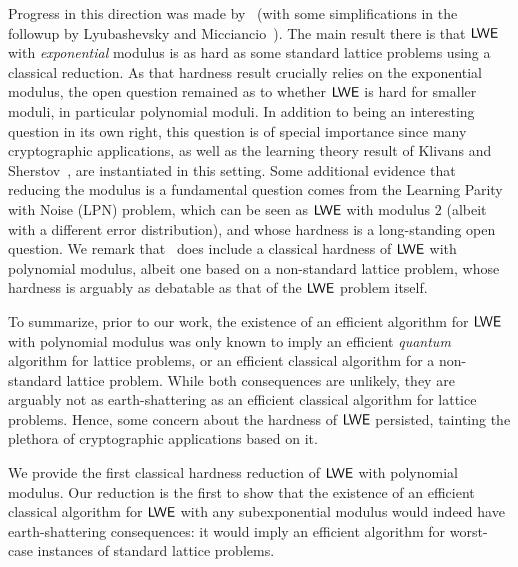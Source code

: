 Progress in this direction was made
by~\cite{DBLP:conf/stoc/Peikert09} (with some simplifications in the
followup by Lyubashevsky and
Micciancio~\cite{DBLP:conf/crypto/LyubashevskyM09}).  The main result
there is that $\mathsf{LWE}$ with \emph{exponential} modulus is as hard as
some standard lattice problems using a
classical reduction.  
As that hardness result crucially relies on the
exponential modulus, the open question remained as to whether $\mathsf{LWE}$
is hard for smaller moduli, in particular polynomial moduli. In
addition to being an interesting question in its own right, this question is of special importance since many cryptographic applications, as well as the learning theory
result of Klivans and Sherstov~\cite{DBLP:conf/focs/KlivansS06}, are instantiated in this setting.
Some additional evidence that reducing the
modulus is a fundamental question comes from the Learning Parity with
Noise (LPN) problem, which can be seen as $\mathsf{LWE}$ with modulus $2$
(albeit with a different error distribution), and whose hardness is a
long-standing open question.  We remark
that~\cite{DBLP:conf/stoc/Peikert09} does include a classical hardness
of $\mathsf{LWE}$ with polynomial modulus, albeit one based on a
non-standard lattice problem, whose hardness is arguably as debatable
as that of the $\mathsf{LWE}$ problem itself.


To summarize, prior to our work, the existence of
an efficient algorithm for $\mathsf{LWE}$ with polynomial modulus was only known to imply an efficient \emph{quantum}
algorithm for lattice problems, or an efficient classical algorithm for a
non-standard lattice problem. While both consequences are unlikely,
they are arguably not as earth-shattering as an efficient classical
algorithm for lattice problems. Hence, some concern about the hardness of
$\mathsf{LWE}$ persisted, tainting the plethora of cryptographic applications
based on it.

We provide the first classical hardness reduction of $\mathsf{LWE}$ with polynomial modulus. Our reduction is
the first to show that the existence of an efficient classical algorithm for $\mathsf{LWE}$
with any subexponential modulus would indeed have earth-shattering consequences: it would imply an efficient algorithm
for worst-case instances of standard lattice problems.

